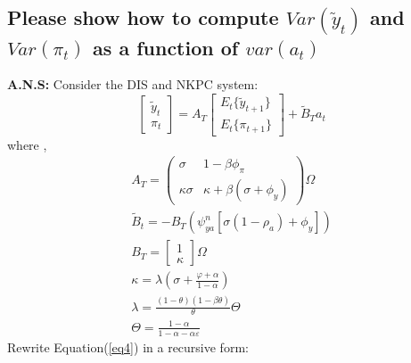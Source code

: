 \documentclass[12pt]{article}
\begin{document}
\subsection{Please show how to compute $Var(\tilde{y}_{t})$ and $Var(\pi_{t})$ as a function of $var(a_t)$ } %
\textbf{A.N.S:} Consider the DIS and NKPC system:
\begin{equation}
\left[
\begin{array}{c}
 \tilde{y}_{t}\\
 \pi_{t}
\end{array}
\right] = A_T
\left[
\begin{array}{c}
E_{t}\{\tilde{y}_{t+1}\}\\
E_{t}\{ \pi_{t+1}\}
\end{array}
\right]+ \tilde{B}_{T}a_t\label{eq4}
\end{equation}
where ,
\begin{gather*}
 A_T = 
\left(
\begin{array}{cc}
 \sigma & 1-\beta\phi_{\pi}      \\
  \kappa\sigma & \kappa+\beta(\sigma+\phi_y)        
\end{array}
\right)\Omega\\
 \tilde{B}_{t}= -B_{T}(\psi^{n}_{ya}[\sigma(1-\rho_{a})+\phi_{y}])\\
B_{T} =\left[
\begin{array}{c}
1\\
\kappa
\end{array}
\right]\Omega\\
\kappa = \lambda(\sigma+\frac{\varphi+\alpha}{1-\alpha})\\
\lambda = \frac{(1-\theta)(1-\beta\theta)}{\theta}\Theta\\
\Theta = \frac{1-\alpha}{1-\alpha-\alpha\varepsilon}
\end{gather*}
Rewrite Equation(\ref{eq4}) in a recursive form:
\end{document}
